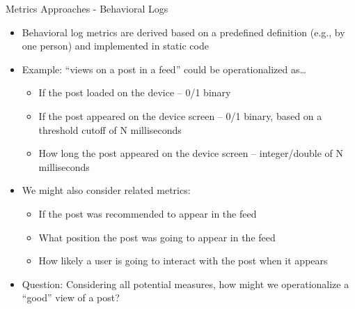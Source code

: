 \documentclass[nobackground,dvipsnames,table]{beamer}
\begin{document}
\begin{frame}{Metrics Approaches - Behavioral Logs}

\small{
\begin{itemize}
    \item Behavioral log metrics are derived based on a predefined definition (e.g., by one person) and implemented in static code
    \item Example: “views on a post in a feed” could be operationalized as…

    \begin{itemize}
        \item If the post loaded on the device – 0/1 binary
        \item If the post appeared on the device screen – 0/1 binary, based on a threshold cutoff of N milliseconds
        \item How long the post appeared on the device screen – integer/double of N milliseconds
    \end{itemize}
    
    \item We might also consider related metrics:
    
    \begin{itemize}
        \item If the post was recommended to appear in the feed
        \item What position the post was going to appear in the feed
        \item How likely a user is going to interact with the post when it appears
    \end{itemize}
    
    \item Question: Considering all potential measures, how might we operationalize a “good” view of a post?
\end{itemize}
}
\end{frame}
\end{document}
